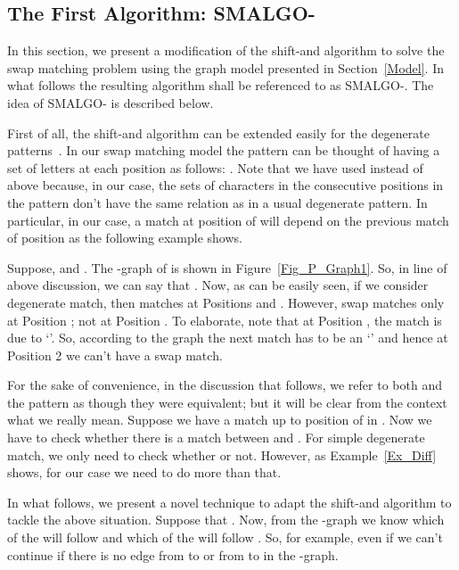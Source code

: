 \documentclass{llncs}
\newcommand{\rom}[1]{\uppercase\expandafter{\romannumeral #1\relax}}
\begin{document}
\subsection{The First Algorithm: SMALGO-\rom{1}}{\label{AIIR}

In this section, we present a modification of  the shift-and algorithm to solve the swap matching problem using the graph model presented in Section~\ref{Model}. In what follows the resulting algorithm shall be referenced to as SMALGO-\rom{1}. The idea of SMALGO-\rom{1} is described below.

 
First of all, the shift-and algorithm can be extended easily for the degenerate patterns~\cite{BG92}. In our swap matching model the pattern can be thought of having a set of letters at each position as follows: . Note that we have used  instead of  above because, in our case, the sets of characters in the consecutive positions in the pattern  don't have the same relation as in a usual degenerate pattern. In particular, in our case, a match at position  of  will depend on the previous match of position  as the following example shows.


\begin{example}\label{Ex_Diff}
Suppose,  and . The -graph of
 is shown in Figure~\ref{Fig_P_Graph1}. So, in line of above
discussion, we can say that . Now, as can be easily seen, if we consider
degenerate match, then  matches  at Positions 
and . However,  swap matches  only at Position ; not at
Position . To elaborate, note that at Position , the match is
due to `'. So, according to the graph  the next match has to
be an `' and hence at Position 2 we can't have a swap match.
\end{example}



For the sake of convenience, in the discussion that
follows, we refer to both  and the pattern  as
though they were equivalent; but it will be clear from the context
what we really mean. Suppose we have a match up to position 
of  in . Now we have to check whether
there is a match between  and . For simple
degenerate match, we only need to check whether 
or not. However, as Example~\ref{Ex_Diff} shows, for our case we
need to do more than that. 



In what follows, we present a novel technique to adapt the shift-and algorithm to tackle the above situation. Suppose that . Now, from the -graph we know which
of the  will follow  and which
of the  will follow . So, for
example, even if  we can't continue if there is 
no edge from  to  or from  to  in the -graph. 


}
\end{document}

